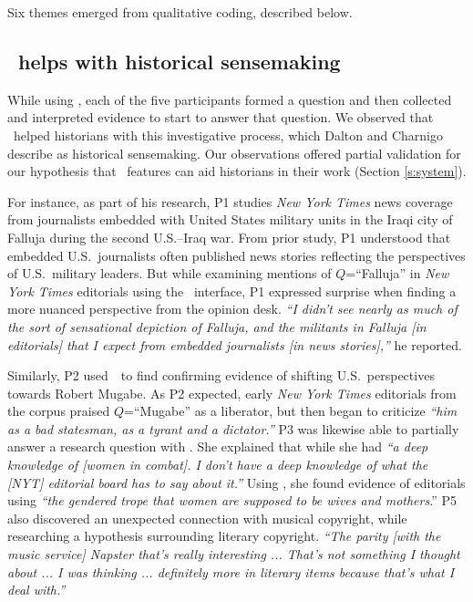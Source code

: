 Six themes emerged from qualitative coding, described below.

\subsection{\ours~helps with historical sensemaking}\label{s:sensemaking}

While using \ours, each of the five participants formed a question and then collected and interpreted evidence to start to answer that question.
We observed that \ours~helped historians with this investigative process, which Dalton and Charnigo \cite{DaltonCharnigo} describe as historical sensemaking. 
Our observations offered partial validation for our hypothesis that \ours~features can aid historians in their work (Section \ref{s:system}).

For instance, as part of his research, P1 studies \textit{New York Times} news coverage from journalists embedded with United States military units in the Iraqi city of Falluja during the second U.S.--Iraq war. 
From prior study, P1 understood that embedded U.S.\ journalists often published news stories reflecting the perspectives of U.S.\ military leaders. 
But while examining mentions of $Q$=``Falluja'' in \textit{New York Times} editorials using the \ours~interface, P1 expressed surprise when finding a more nuanced perspective from the opinion desk.  \textit{``I didn't see nearly as much of the sort of sensational depiction of Falluja, and the militants in Falluja [in editorials] that I expect from embedded journalists [in news stories],''} he reported. 

Similarly, P2 used~\ours~to find confirming evidence of shifting U.S.\ perspectives towards Robert Mugabe.
As P2 expected, early \textit{New York Times} editorials from the corpus praised $Q$=``Mugabe'' as a liberator, but then began to criticize \textit{``him as a bad statesman, as a tyrant and a dictator.''} 
P3 was likewise able to partially answer a research question with \ours.
She explained that while she had \textit{``a deep knowledge of [women in combat]. I don't have a deep knowledge of what the [NYT] editorial board has to say about it.''} 
Using \ours, she found evidence of editorials using \textit{``the gendered trope that women are supposed to be wives and mothers}.''
P5 also discovered an unexpected connection with musical copyright, while researching a hypothesis surrounding literary copyright. 
\textit{``The parity [with the music service] Napster that's really interesting ... That's not something I thought about ... I was thinking ... definitely more in literary items because that's what I deal with.''}

